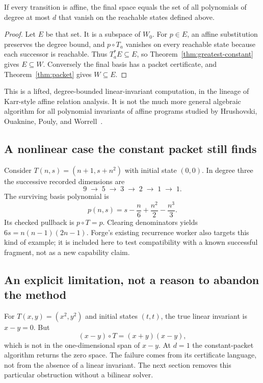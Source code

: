 \begin{theorem}
\label{thm:affine-complete}
If every transition is affine, the final space equals the set of all
polynomials of degree at most $d$ that vanish on the reachable states defined
above.
\end{theorem}
\begin{proof}
Let $E$ be that set. It is a subspace of $W_0$. For $p\in E$, an affine
substitution preserves the degree bound, and $p\circ T_a$ vanishes on every
reachable state because each successor is reachable. Thus $T_a^*E\subseteq E$,
so Theorem~\ref{thm:greatest-constant} gives $E\subseteq W$. Conversely the final
basis has a packet certificate, and Theorem~\ref{thm:packet} gives $W\subseteq E$.
\end{proof}

This is a lifted, degree-bounded linear-invariant computation, in the lineage of
Karr-style affine relation analysis. It is not the much more general algebraic
algorithm for all polynomial invariants of affine programs studied by
Hrushovski, Ouaknine, Pouly, and Worrell~\cite{karr,affine-invariants}.

\subsection{A nonlinear case the constant packet still finds}
Consider $T(n,s)=(n+1,s+n^2)$ with initial state $(0,0)$. In degree three the
successive recorded dimensions are
\[
 9\;\longrightarrow\;5\;\longrightarrow\;3\;\longrightarrow\;2
 \;\longrightarrow\;1\;\longrightarrow\;1.
\]
The surviving basis polynomial is
\[
 p(n,s)=s-\frac{n}{6}+\frac{n^2}{2}-\frac{n^3}{3}.
\]
Its checked pullback is $p\circ T=p$. Clearing denominators yields
$6s=n(n-1)(2n-1)$. Forge's existing recurrence worker also targets this kind of
example; it is included here to test compatibility with a known successful
fragment, not as a new capability claim.

\subsection{An explicit limitation, not a reason to abandon the method}
For $T(x,y)=(x^2,y^2)$ and initial states $(t,t)$, the true linear invariant is
$x-y=0$. But
\[
 (x-y)\circ T=(x+y)(x-y),
\]
which is not in the one-dimensional span of $x-y$. At $d=1$ the constant-packet
algorithm returns the zero space. The failure comes from its certificate
language, not from the absence of a linear invariant. The next section removes
this particular obstruction without a bilinear solver.

